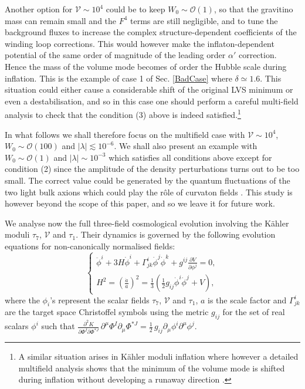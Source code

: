 \documentclass[11pt,a4paper]{article}
\newcommand{\be}{\begin{equation}}
\newcommand{\ee}{\end{equation}}
\newcommand\vo{{\mathcal{V}}}
\newcommand{\mc}{\mathcal}
\begin{document}
Another option for $\vo \sim 10^4$ could be to keep $W_0\sim \mc{O}(1)$, so that the gravitino mass can remain small and the $F^4$ terms are still negligible, and to tune the background fluxes to increase the complex structure-dependent coefficients of the winding loop corrections. This would however 
make the inflaton-dependent potential of the same order of magnitude of the leading order $\alpha'$ correction. Hence the mass of the volume mode becomes of order the Hubble scale during inflation. This is the example of case 1 of Sec. \ref{BadCase} where $\delta \simeq 1.6$. This situation could either cause a considerable shift of the original LVS minimum or even a destabilisation, and so in this case one should perform a careful multi-field analysis to check that the condition (3) above is indeed satisfied.\footnote{A similar situation arises in K\"ahler moduli inflation where however a detailed multifield analysis shows that the minimum of the volume mode is shifted during inflation without developing a runaway direction \cite{Cicoli:2017shd, BlancoPillado:2009nw}.}

In what follows we shall therefore focus on the multifield case with $\vo\sim 10^4$, $W_0\sim \mc{O}(100)$ and $|\lambda|\lesssim 10^{-6}$. We shall also present an example with $W_0\sim \mc{O}(1)$ and $|\lambda| \sim 10^{-3}$ which satisfies all conditions above except for condition (2) since the amplitude of the density perturbations turns out to be too small. The correct value could be generated by the quantum fluctuations of the two light bulk axions which could play the r\^ole of curvaton fields \cite{curvaton}. This study is however beyond the scope of this paper, and so we leave it for future work. 

We analyse now the full three-field cosmological evolution involving the K\"ahler moduli $\tau_7$, $\vo$ and $\tau_1$. Their dynamics is governed by the 
following evolution equations for non-canonically normalised fields:
\be
 \left\{
 \begin{array}{c}
 \ddot{\phi}^{i}+3H\dot{\phi}^{i}
 +\Gamma_{jk}^{i}\dot{\phi}^{j}\dot{ \phi}^k+g^{ij}\frac{\partial V}{\partial \phi ^j}=0, \\
 H^2=\left( \frac{\dot{a}}{a}\right)^2=\frac13 \left(\frac12 g_{ij}\dot{\phi}^i\dot{\phi}^j+V \right),
 \end{array}
 \right.
\ee
where the $\phi_i$'s represent the scalar fields $\tau_7$, $\vo$ and $\tau_1$, $a$ is the scale factor and $\Gamma_{jk}^{i}$ are the target space Christoffel symbols using the metric $g_{ij}$ for the set of real scalars $\phi^i$ such that $\frac{\partial^2 K}{\partial \Phi^I
\partial \Phi^{*J}} \,\partial^{\mu}\Phi^I\partial_{\mu}\Phi^{*J} =\frac12\,g_{ij}\partial_{\mu}\phi^i\partial^{\mu}\phi^j$.
\end{document}
